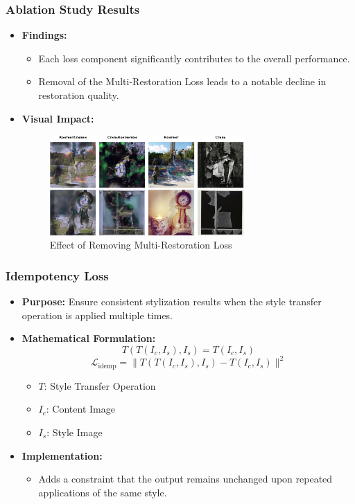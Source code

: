\begin{frame}
\frametitle{Ablation Study Results}

\begin{itemize}
    \item \textbf{Findings:}
    \begin{itemize}
        \item Each loss component significantly contributes to the overall performance.
        \item Removal of the Multi-Restoration Loss leads to a notable decline in restoration quality.
    \end{itemize}
    \item \textbf{Visual Impact:}
    \begin{figure}[H]
        \centering
        \includegraphics[width=0.7\textwidth]{figures/ablation_results.png}
        \caption{Effect of Removing Multi-Restoration Loss}
        \label{fig:ablation}
    \end{figure}
\end{itemize}

\end{frame}

\begin{frame}
\frametitle{Idempotency Loss}

\begin{itemize}
    \item \textbf{Purpose:} Ensure consistent stylization results when the style transfer operation is applied multiple times.
    \item \textbf{Mathematical Formulation:}
    \[
    T(T(I_c, I_s), I_s) = T(I_c, I_s)
    \]
    \[
    \mathcal{L}_{\text{idemp}} = \| T(T(I_c, I_s), I_s) - T(I_c, I_s) \|^2
    \]
    \begin{itemize}
        \item \(T\): Style Transfer Operation
        \item \(I_c\): Content Image
        \item \(I_s\): Style Image
    \end{itemize}
    \item \textbf{Implementation:}
    \begin{itemize}
        \item Adds a constraint that the output remains unchanged upon repeated applications of the same style.
    \end{itemize}
\end{itemize}

\end{frame}

